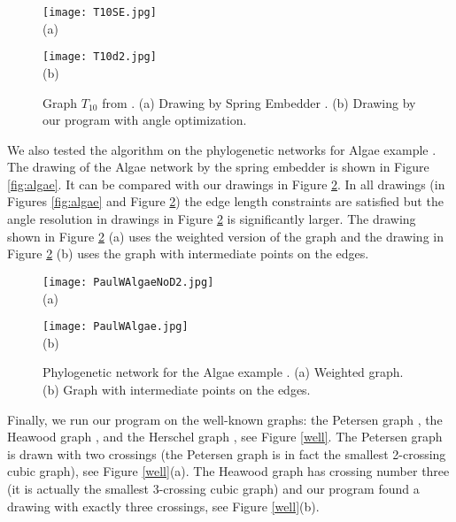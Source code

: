 \documentclass[10pt]{article}
\begin{document}
\begin{figure}[htp]
\centering
\begin{minipage}[b]{0.45\linewidth}
\centering \texttt{[image: T10SE.jpg]}\\ (a)
\end{minipage}
\begin{minipage}[b]{0.45\linewidth}
\centering \texttt{[image: T10d2.jpg]}\\ (b)
\end{minipage}
\caption{Graph $T_{10}$ from \cite{rv-06}. (a) Drawing by Spring Embedder \cite{embedder}.
(b) Drawing by our program with angle optimization.}
\label{t10}
\end{figure}

We also tested the algorithm on the phylogenetic networks for Algae example \cite{pb-opn-12}.
The drawing of the Algae network by  the spring embedder \cite{embedder} is shown in Figure 
\ref{fig:algae}. It can be compared with our drawings in Figure \ref{algae}. 
In all drawings (in Figures \ref{fig:algae} and Figure \ref{algae}) the edge length constraints are
satisfied but the angle resolution in drawings in Figure \ref{algae} is significantly larger. 
The drawing shown in Figure \ref{algae} (a) uses the weighted version of the graph and the drawing in Figure \ref{algae} (b) uses the graph with  intermediate points on the edges. 

\begin{figure}[htp]
\centering
\begin{minipage}[b]{0.45\linewidth}
\centering \texttt{[image: PaulWAlgaeNoD2.jpg]}\\ (a)
\end{minipage}
\begin{minipage}[b]{0.45\linewidth}
\centering \texttt{[image: PaulWAlgae.jpg]}\\ (b)
\end{minipage}
\caption{Phylogenetic network for the Algae example \cite{pb-opn-12}.
(a) Weighted graph. (b) Graph with intermediate points on the edges.}
\label{algae}
\end{figure}

Finally, we run our program on the well-known graphs: 
the Petersen graph \cite{hs-93}, the Heawood graph \cite{har-91}, and 
the Herschel graph \cite{bh-81}, see Figure \ref{well}.
The Petersen graph is drawn with two crossings (the Petersen graph is in fact the 
smallest 2-crossing cubic graph), see Figure \ref{well}(a).
The Heawood graph has crossing number three (it is actually the smallest 3-crossing cubic graph) and our program found a drawing with exactly three crossings, see Figure \ref{well}(b).
\end{document}
